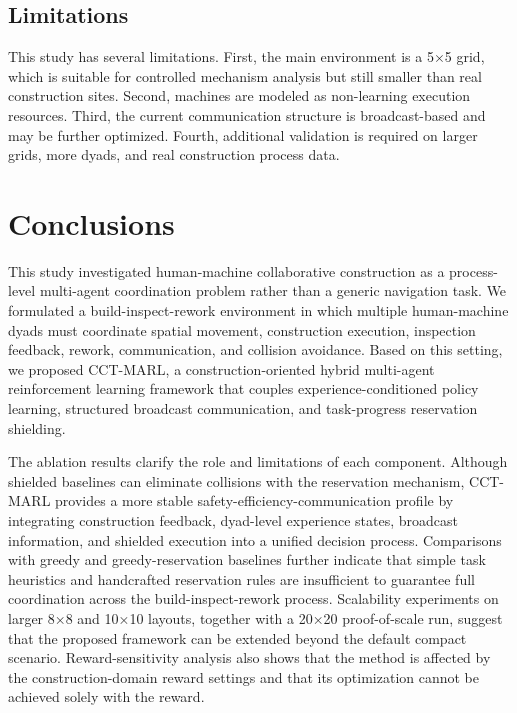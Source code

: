 \documentclass[fleqn,10pt]{wlpeerj}
\begin{document}
\subsection{Limitations}

This study has several limitations. First, the main environment is a 5$\times$5 grid, which is suitable for controlled mechanism analysis but still smaller than real construction sites. Second, machines are modeled as non-learning execution resources. Third, the current communication structure is broadcast-based and may be further optimized. Fourth, additional validation is required on larger grids, more dyads, and real construction process data.

\section{Conclusions}

This study investigated human-machine collaborative construction as a process-level multi-agent coordination problem rather than a generic navigation task. We formulated a build-inspect-rework environment in which multiple human-machine dyads must coordinate spatial movement, construction execution, inspection feedback, rework, communication, and collision avoidance. Based on this setting, we proposed CCT-MARL, a construction-oriented hybrid multi-agent reinforcement learning framework that couples experience-conditioned policy learning, structured broadcast communication, and task-progress reservation shielding.

The ablation results clarify the role and limitations of each component. Although shielded baselines can eliminate collisions with the reservation mechanism, CCT-MARL provides a more stable safety-efficiency-communication profile by integrating construction feedback, dyad-level experience states, broadcast information, and shielded execution into a unified decision process. Comparisons with greedy and greedy-reservation baselines further indicate that simple task heuristics and handcrafted reservation rules are insufficient to guarantee full coordination across the build-inspect-rework process. Scalability experiments on larger 8×8 and 10×10 layouts, together with a 20×20 proof-of-scale run, suggest that the proposed framework can be extended beyond the default compact scenario. Reward-sensitivity analysis also shows that the method is affected by the construction-domain reward settings and that its optimization cannot be achieved solely with the reward.
\end{document}

